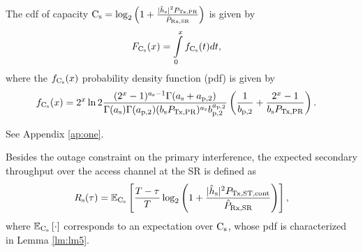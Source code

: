 \begin{lemma} \label{lm:lm5}
\normalfont
The cdf of capacity $\text{C}_{\text{s}} = \log_2 \left(1 + \frac{|\hat{h}_{\text{s}}|^2 P_{\text{Tx,PR}}}{\hat{P}_{\text{Rx,SR}}} \right)$ is given by
\begin{align}
F_{\text{C}_{\text{s}}}(x) &= \int\limits_{0}^{x} f_{\text{C}_{\text{s}}}(t) dt, \label{eq:dis_C} 
\end{align}
where the $f_{\text{C}_{\text{s}}}(x)$ probability density function (pdf) is given by 
\begin{align}
f_{\text{C}_{\text{s}}}(x) &= 2^x \ln 2 \frac{(2^x - 1)^{a_{\text{s}} - 1} \Gamma(a_{\text{s}} + a_{\text{p,2}})}{\Gamma(a_{\text{s}}) \Gamma(a_{\text{p,2}}) (b_{\text{s}} P_{\text{Tx,PR}}) ^{a_{\text{s}}} b_{\text{p,2}}^{a_{\text{p,2}}}} \left(\frac{1}{b_{\text{p,2}}} + \frac{2^x - 1}{b_{\text{s}} P_{\text{Tx,PR}}}\right). \label{eq:den_C}
\end{align}
\end{lemma}
\begin{IEEEproof}
See Appendix \ref{ap:one}.
\end{IEEEproof}
Besides the outage constraint on the primary interference, the expected secondary throughput over the access channel at the SR is defined as
\begin{align}
R_{\text{s}}(\tau) = {\mathbb E}_{\text{C}_{\text{s}}}\left[ \frac{T - \tau}{T} \log_2 \left(1 + \frac{|\hat{h}_{\text{s}}|^2 P_{\text{Tx,ST,cont}} }{\hat{P}_{\text{Rx,SR}}} \right) \right], \label{eq:rs}
\end{align} 
where ${\mathbb E}_{\text{C}_{\text{s}}}\left[ \cdot \right]$ corresponds to an expectation over $\text{C}_{\text{s}}$, whose pdf is characterized in Lemma \ref{lm:lm5}. 

